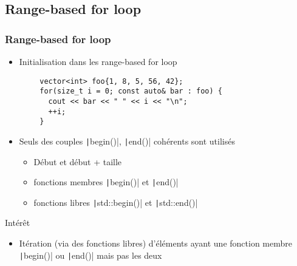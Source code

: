 \documentclass[C++.tex]{subfiles}
\begin{document}
\subsection*{Range-based for loop}
\begin{frame}[fragile]
	\frametitle{Range-based for loop}
	\begin{itemize}
		\item Initialisation dans les range-based for loop
	\end{itemize}

	\begin{verbatim}
		vector<int> foo{1, 8, 5, 56, 42};
		for(size_t i = 0; const auto& bar : foo) {
		  cout << bar << " " << i << "\n";
		  ++i;
		}
	\end{verbatim}

	\begin{itemize}
		\item Seuls des couples \texttt|begin()|, \texttt|end()| cohérents sont utilisés
		\begin{itemize}
			\item \og Début\fg{} et \og début + taille\fg{}
			\item fonctions membres \texttt|begin()| et \texttt|end()|
			\item fonctions libres \texttt|std::begin()| et \texttt|std::end()|
		\end{itemize}
	\end{itemize}

	\begin{block}{Intérêt}
		\begin{itemize}
			\item Itération (via des fonctions libres) d'éléments ayant une fonction membre \texttt|begin()| ou \texttt|end()| mais pas les deux
		\end{itemize}
	\end{block}



\end{frame}
\end{document}
